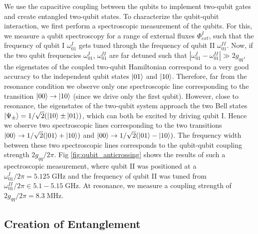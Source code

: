 We use the capacitive coupling between the qubits to implement two-qubit gates and create entangled two-qubit states. To characterize the qubit-qubit interaction, we first perform a spectroscopic measurement of the qubits. For this, we measure a qubit spectroscopy for a range of external fluxes $\Phi_{ext}^I$, such that the frequency of qubit I $\omega_{01}^I$ gets tuned through the frequency of qubit II $\omega_{01}^{II}$. Now, if the two qubit frequencies $\omega_{01}^I$, $\omega_{01}^{II}$ are far detuned such that $|\omega_{01}^I-\omega_{01}^{II}|\gg 2g_{qq}$, the eigenstates of the coupled two-qubit Hamiltonian correspond to a very good accuracy to the independent qubit states $\left| 01 \right>$ and $\left| 10 \right>$. Therefore, far from the resonance condition we observe only one spectroscopic line corresponding to the transition $\left| 00 \right>\to\left| 10 \right>$ (since we drive only the first qubit). However, close to resonance, the eigenstates of the two-qubit system approach the two Bell states $\left| \Psi_\pm \right> = 1/\sqrt{2}(\left| 10 \right>\pm\left| 01 \right>)$, which can both be excited by driving qubit I. Hence we observe two spectroscopic lines corresponding to the two transitions $\left| 00 \right>\to 1/\sqrt{2}(\left| 01 \right>+\left| 10 \right>)$ and $\left| 00 \right>\to 1/\sqrt{2}(\left| 01 \right>-\left| 10 \right>)$. The frequency width between these two spectroscopic lines corresponds to the qubit-qubit coupling strength $2g_{qq}/2\pi$. Fig \ref{fig:qubit_anticrossing} shows the results of such a spectroscopic measurement, where qubit II was positioned at a $\omega_{01}^I/2\pi = 5.125\;\mathrm{GHz}$ and the frequency of qubit II was tuned from $\omega_{01}^{II}/2\pi\in 5.1-5.15\;\mathrm{GHz}$. At resonance, we measure a coupling strength of $2g_{qq}/2\pi = 8.3\;\mathrm{MHz}$.

\subsection{Creation of Entanglement} \label{section:creation_of_entanglement}

